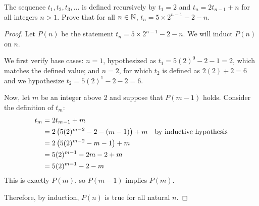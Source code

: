 \question The sequence $t_1, t_2, t_3, \dots$ is defined recursively by
$t_1=2$ and $t_n = 2t_{n-1}+n$ for all integers $n > 1$.
Prove that for all $n\in\mathbb{N}$, $t_n = 5 \times 2^{n-1} - 2 - n$.
\begin{proof}
  Let $P(n)$ be the statement $t_n = 5 \times 2^{n-1} - 2 - n$.
  We will induct $P(n)$ on $n$.

  We first verify base cases: $n = 1$, hypothesized as $t_1 = 5(2)^0-2-1 = 2$, which matches the defined value;
  and $n=2$, for which $t_2$ is defined as $2(2)+2 = 6$ and we hypothesize $t_2 = 5(2)^{1}-2-2 = 6$.

  Now, let $m$ be an integer above 2 and suppose that $P(m-1)$ holds.
  Consider the definition of $t_m$:
  \begin{align*}
    t_m & = 2t_{m-1}+m                                   \\
        & = 2\left( 5(2)^{m-2} - 2 - (m-1) \right)+m & \text{by inductive hypothesis} \\
        & = 2\left( 5(2)^{m-2} - m - 1 \right)+m         \\
        & = 5(2)^{m-1} - 2m - 2 + m                      \\
        & = 5(2)^{m-1} - 2 - m
  \end{align*}
  This is exactly $P(m)$, so $P(m-1)$ implies $P(m)$.

  Therefore, by induction, $P(n)$ is true for all natural $n$.
\end{proof}


